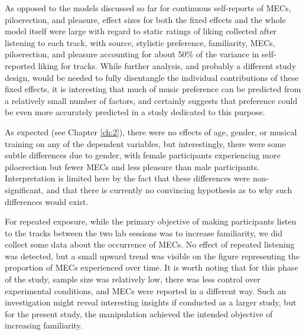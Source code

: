 As opposed to the models discussed so far for continuous self-reports of MECs, piloerection, and pleasure, effect sizes for both the fixed effects and the whole model itself were large with regard to static ratings of liking collected after listening to each track, with source, stylistic preference, familiarity, MECs, piloerection, and pleasure accounting for about 50\% of the variance in self-reported liking for tracks. While further analysis, and probably a different study design, would be needed to fully disentangle the individual contributions of these fixed effects, it is interesting that much of music preference can be predicted from a relatively small number of factors, and certainly suggests that preference could be even more accurately predicted in a study dedicated to this purpose.

As expected (see Chapter \ref{ch:2}), there were no effects of age, gender, or musical training on any of the dependent variables, but interestingly, there were some subtle differences due to gender, with female participants experiencing more piloerection but fewer MECs and less pleasure than male participants. Interpretation is limited here by the fact that these differences were non-significant, and that there is currently no convincing hypothesis as to why such differences would exist.

For repeated exposure, while the primary objective of making participants listen to the tracks between the two lab sessions was to increase familiarity, we did collect some data about the occurrence of MECs. No effect of repeated listening was detected, but a small upward trend was visible on the figure representing the proportion of MECs experienced over time. It is worth noting that for this phase of the study, sample size was relatively low, there was less control over experimental conditions, and MECs were reported in a different way. Such an investigation might reveal interesting insights if conducted as a larger study, but for the present study, the manipulation achieved the intended objective of increasing familiarity.

